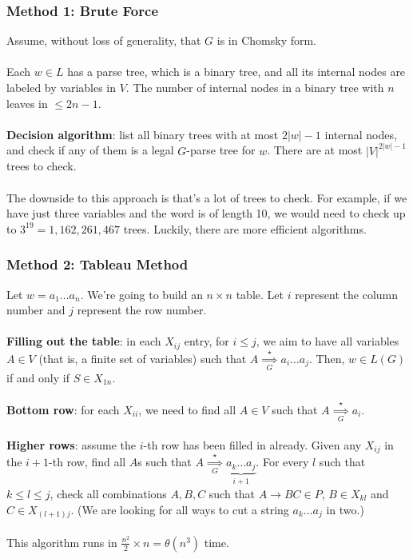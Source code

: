 \documentclass[]{article}
\theoremstyle{definition}
\begin{document}
        \subsubsection{Method 1: Brute Force}
          Assume, without loss of generality, that $G$ is in Chomsky form.
          \\ \\
          Each $w \in L$ has a parse tree, which is a binary tree, and all its internal nodes are labeled by variables in $V$. The number of internal nodes in a binary tree with $n$ leaves in $\le 2n - 1$.
          \\ \\
          \textbf{Decision algorithm}: list all binary trees with at most $2|w| - 1$ internal nodes, and check if any of them is a legal $G$-parse tree for $w$. There are at most $|V|^{2|w| - 1}$ trees to check.
          \\ \\
          The downside to this approach is that's a lot of trees to check. For example, if we have just three variables and the word is of length 10, we would need to check up to $3^{19} = 1,162,261,467$ trees. Luckily, there are more efficient algorithms.

        \subsubsection{Method 2: Tableau Method}
          Let $w = a_1 \ldots a_n$. We're going to build an $n \times n$ table. Let $i$ represent the column number and $j$ represent the row number.
          \\ \\
          \textbf{Filling out the table}: in each $X_{ij}$ entry, for $i \le j$, we aim to have all variables $A \in V$ (that is, a finite set of variables) such that $A \underset{G}{\overset{\star}{\implies}} a_i \ldots a_j$. Then, $w \in L(G)$ if and only if $S \in X_{1n}$.
          \\ \\
          \textbf{Bottom row}: for each $X_{ii}$, we need to find all $A \in V$ such that $A \underset{G}{\overset{\star}{\implies}} a_i$.
          \\ \\
          \textbf{Higher rows}: assume the $i$-th row has been filled in already. Given any $X_{ij}$ in the $i+1$-th row, find all $A$s such that $A \underset{G}{\overset{\star}{\implies}} \underbrace{a_k \ldots a_j}_{i + 1}$. For every $l$ such that $k \le l \le j$, check all combinations $A, B, C$ such that $A \to BC \in P$, $B \in X_{kl}$ and $C \in X_{(l + 1)j}$. (We are looking for all ways to cut a string $a_k \ldots a_j$ in two.)
          \\ \\
          This algorithm runs in $\frac{n^2}{2} \times n = \theta(n^3)$ time.
\end{document}
